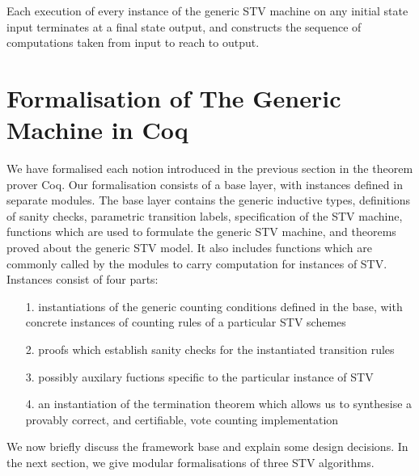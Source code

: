 \documentclass{llncs}
\begin{document}
\begin{theorem}[Termination]\label{termination}
Each execution of every instance of the generic STV machine on any
initial state
\textsf{input} terminates at a final state \textsf{output},
and constructs the sequence of computations taken from
\textsf{input} to reach to \textsf{output}.  
\end{theorem}   


\section{Formalisation of The Generic Machine in Coq}
We have formalised each notion introduced in the previous section in
the theorem prover Coq. Our formalisation consists of a base layer,
with instances defined in separate modules.
The base layer contains the generic
inductive types, definitions of sanity checks, parametric transition
labels, specification of the STV machine, functions which are used
to formulate the generic STV machine, and theorems proved about the
generic STV model. It also includes functions which are commonly
called by the modules to carry computation for instances of STV.
Instances consist of four parts:

\begin{itemize}
\item[1.] instantiations of the generic counting conditions defined in the base, with concrete instances of counting rules of a particular STV schemes
\item[2.] proofs which establish sanity checks for the instantiated transition rules
\item[3.] possibly auxilary fuctions specific to the particular
instance of STV
\item[4.] an instantiation of the termination theorem which allows
us to synthesise a provably correct, and certifiable, vote counting
implementation
\end{itemize}       
We now  briefly discuss the framework base and explain some design
decisions. In the next section, we give  modular formalisations of three STV algorithms.  
\end{document}
